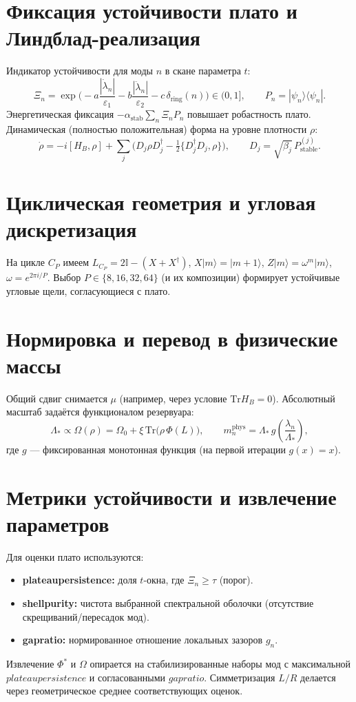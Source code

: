\documentclass[a4paper,12pt]{article}
\def\Omega{Ω}%
\def\Xi{Ξ}%
\def\Phi{Φ}%
\def\Lambda{Λ}%
\def\_{}%
\newcommand{\Tr}{\mathrm{Tr}}
\newcommand{\Id}{\mathbb{I}}
\begin{document}
\section{Фиксация устойчивости плато и Линдблад-реализация}\label{sec:stability}
Индикатор устойчивости для моды $n$ в скане параметра $t$:
\begin{equation}
\Xi_n = \exp\!\Big(- a\frac{|\dot{\lambda}_n|}{\varepsilon_1}
- b\frac{|\ddot{\lambda}_n|}{\varepsilon_2}
- c\,\delta_{\mathrm{ring}}(n)\Big)\in(0,1],\qquad P_n=|\psi_n\rangle\langle\psi_n|.
\end{equation}
Энергетическая фиксация $-\alpha_{\mathrm{stab}}\sum_n \Xi_n P_n$ повышает робастность плато. 
Динамическая (полностью положительная) форма на уровне плотности $\rho$:
\begin{equation}
\dot\rho=-i[H_B,\rho]+\sum_j\big(D_j\rho D_j^\dagger-\tfrac12\{D_j^\dagger D_j,\rho\}\big),\qquad D_j=\sqrt{\beta_j}\,P^{(j)}_{\mathrm{stable}}.
\end{equation}

\section{Циклическая геометрия и угловая дискретизация}
На цикле $C_P$ имеем $L_{C_P}=2\Id-(X+X^\dagger)$, $X|m\rangle=|m+1\rangle$, $Z|m\rangle=\omega^m|m\rangle$, $\omega=e^{2\pi i/P}$. 
Выбор $P\in\{8,16,32,64\}$ (и их композиции) формирует устойчивые угловые щели, согласующиеся с плато.

\section{Нормировка и перевод в физические массы}
Общий сдвиг снимается $\mu$ (например, через условие $\Tr H_B=0$). Абсолютный масштаб задаётся функционалом резервуара:
\begin{equation}
\Lambda_* \propto \Omega(\rho)=\Omega_0+\xi\,\Tr\!\big(\rho\,\Phi(L)\big),\qquad 
m_n^{\mathrm{phys}}=\Lambda_*\,g\!\left(\frac{\lambda_n}{\Lambda_*}\right),
\end{equation}
где $g$ --- фиксированная монотонная функция (на первой итерации $g(x)=x$).

\section{Метрики устойчивости и извлечение параметров}\label{sec:metrics}
Для оценки плато используются:
\begin{itemize}
\item \textbf{plateau\_persistence:} доля $t$-окна, где $\Xi_n \ge \tau$ (порог).
\item \textbf{shell\_purity:} чистота выбранной спектральной оболочки (отсутствие скрещиваний/пересадок мод).
\item \textbf{gap\_ratio:} нормированное отношение локальных зазоров $g_n$.
\end{itemize}
Извлечение $\Phi^*$ и $\Omega$ опирается на стабилизированные наборы мод с максимальной $plateau\_persistence$ и согласованными $gap\_ratio$. Симметризация $L/R$ делается через геометрическое среднее соответствующих оценок.
\end{document}
